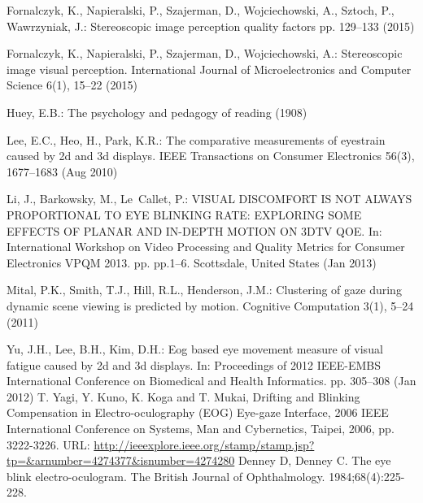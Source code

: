 \documentclass[conference]{IEEEtran}
\begin{document}
\begin{thebibliography}{00}
Fornalczyk, K., Napieralski, P., Szajerman, D., Wojciechowski, A., Sztoch, P.,
Wawrzyniak, J.: Stereoscopic image perception quality factors pp. 129--133
(2015)

Fornalczyk, K., Napieralski, P., Szajerman, D., Wojciechowski, A.: Stereoscopic
image visual perception. International Journal of Microelectronics and
Computer Science  6(1),  15--22 (2015)

Huey, E.B.: The psychology and pedagogy of reading (1908)

Lee, E.C., Heo, H., Park, K.R.: The comparative measurements of eyestrain
caused by 2d and 3d displays. IEEE Transactions on Consumer Electronics
56(3),  1677--1683 (Aug 2010)

Li, J., Barkowsky, M., Le~Callet, P.: {VISUAL DISCOMFORT IS NOT ALWAYS
	PROPORTIONAL TO EYE BLINKING RATE: EXPLORING SOME EFFECTS OF PLANAR AND
	IN-DEPTH MOTION ON 3DTV QOE}. In: {International Workshop on Video Processing
	and Quality Metrics for Consumer Electronics VPQM 2013}. pp. pp.1--6.
Scottsdale, United States (Jan 2013)

Mital, P.K., Smith, T.J., Hill, R.L., Henderson, J.M.: Clustering of gaze
during dynamic scene viewing is predicted by motion. Cognitive Computation
3(1),  5--24 (2011)

Yu, J.H., Lee, B.H., Kim, D.H.: Eog based eye movement measure of visual
fatigue caused by 2d and 3d displays. In: Proceedings of 2012 IEEE-EMBS
International Conference on Biomedical and Health Informatics. pp. 305--308
(Jan 2012)
T. Yagi, Y. Kuno, K. Koga and T. Mukai, Drifting and Blinking Compensation in Electro-oculography (EOG) Eye-gaze Interface, 2006 IEEE International Conference on Systems, Man and Cybernetics, Taipei, 2006, pp. 3222-3226.
URL: \url{http://ieeexplore.ieee.org/stamp/stamp.jsp?tp=&arnumber=4274377&isnumber=4274280}
Denney D, Denney C. The eye blink electro-oculogram. The British Journal of Ophthalmology. 1984;68(4):225-228.



\end{thebibliography}
\end{document}
